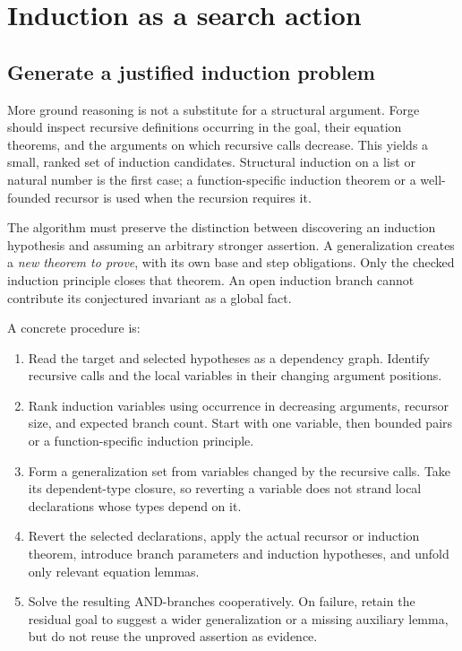 \section{Induction as a search action}

\subsection{Generate a justified induction problem}

More ground reasoning is not a substitute for a structural argument. Forge
should inspect recursive definitions occurring in the goal, their equation
theorems, and the arguments on which recursive calls decrease. This yields a
small, ranked set of induction candidates. Structural induction on a list or
natural number is the first case; a function-specific induction theorem or a
well-founded recursor is used when the recursion requires it.

The algorithm must preserve the distinction between discovering an induction
hypothesis and assuming an arbitrary stronger assertion. A generalization
creates a \emph{new theorem to prove}, with its own base and step obligations.
Only the checked induction principle closes that theorem. An open induction
branch cannot contribute its conjectured invariant as a global fact.

A concrete procedure is:
\begin{enumerate}
\item Read the target and selected hypotheses as a dependency graph. Identify
recursive calls and the local variables in their changing argument positions.
\item Rank induction variables using occurrence in decreasing arguments,
recursor size, and expected branch count. Start with one variable, then bounded
pairs or a function-specific induction principle.
\item Form a generalization set from variables changed by the recursive calls.
Take its dependent-type closure, so reverting a variable does not strand local
declarations whose types depend on it.
\item Revert the selected declarations, apply the actual recursor or induction
theorem, introduce branch parameters and induction hypotheses, and unfold only
relevant equation lemmas.
\item Solve the resulting AND-branches cooperatively. On failure, retain the
residual goal to suggest a wider generalization or a missing auxiliary lemma,
but do not reuse the unproved assertion as evidence.
\end{enumerate}

